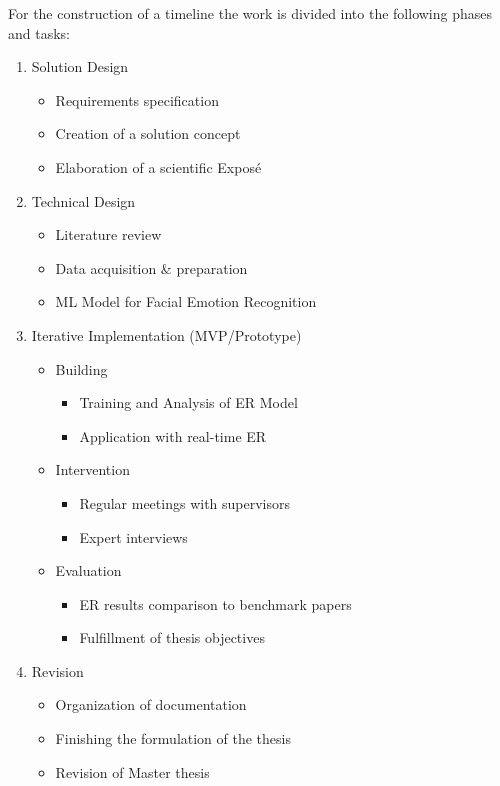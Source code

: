 \documentclass[11pt,a4paper]{scrbook}
\begin{document}
For the construction of a timeline the work is divided into the following phases and tasks:
\begin{enumerate}
    \item Solution Design
    \begin{itemize}
        \item Requirements specification
        \item Creation of a solution concept
        \item Elaboration of a scientific Exposé
    \end{itemize}
    \item Technical Design
    \begin{itemize}
        \item Literature review
        \item Data acquisition \& preparation
        \item ML Model for Facial Emotion Recognition
    \end{itemize}
    \item Iterative Implementation (MVP/Prototype)
    \begin{itemize}
        \item Building
            \begin{itemize}
                \item Training and Analysis of \gls{ER} Model
                \item Application with real-time \gls{ER}
            \end{itemize}
        \item Intervention
            \begin{itemize}
                \item Regular meetings with supervisors
                \item Expert interviews
            \end{itemize}
        \item Evaluation
            \begin{itemize}
                \item \gls{ER} results comparison to benchmark papers
                \item Fulfillment of thesis objectives
            \end{itemize}
    \end{itemize}
    \item Revision
    \begin{itemize}
        \item Organization of documentation 
        \item Finishing the formulation of the thesis
        \item Revision of Master thesis 
    \end{itemize}
\end{enumerate}
\vspace*{1cm}
\end{document}
